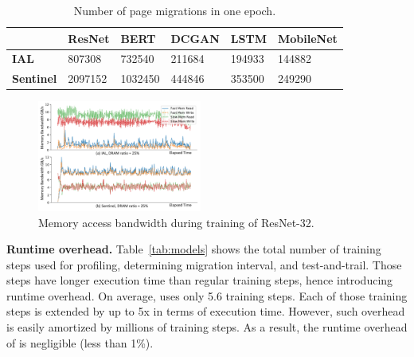 \begin{table}[]
\small
\caption{Number of page migrations in one epoch. %
}
\vspace{-5pt}
\begin{tabular}{|p{1.05cm}|p{1cm}|p{0.9cm}|p{1cm}|p{0.9cm}|p{1.1cm}|}
\hline
   & ResNet & BERT & DCGAN & LSTM & MobileNet \\ \hline
\textbf{IAL}  & 807308	& 732540 &	211684	&194933  & 144882 \\ \hline
\textbf{Sentinel} & 2097152	& 1032450	& 444846 &	353500  & 249290 \\ \hline
\end{tabular}
\vspace{-5pt}
\label{tab:migration}
\end{table}
\begin{figure}
\centering
\includegraphics[width=0.48\textwidth]{figures/bandwidth.pdf}
\vspace{-20pt}
\caption{\textcolor{check}{Memory access bandwidth during training of ResNet-32}.}
\vspace{-5pt}
\label{fig:bandwidth_consumption}
\end{figure}


\textcolor{check}{\textbf{Runtime overhead.}%
Table~\ref{tab:models} shows the total number of training steps used for profiling, determining migration interval,  and test-and-trail. Those steps have longer execution time than regular training steps, hence introducing runtime overhead. On average, \name uses only 5.6 training steps. Each of those training steps is extended by up to \textcolor{check}{5x} in terms of execution time. However, such overhead is easily amortized by millions of training steps. As a result, the runtime overhead of \name is negligible (less than 1\%).}



